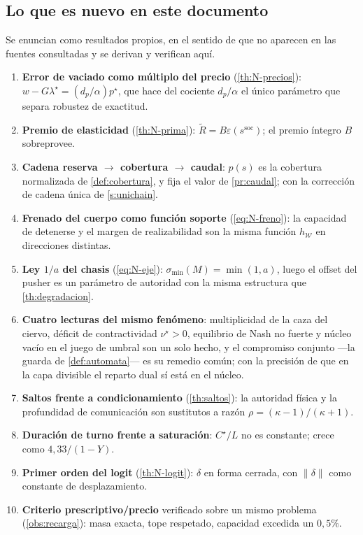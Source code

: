 \subsection{Lo que es nuevo en este documento}

Se enuncian como resultados propios, en el sentido de que no aparecen en las
fuentes consultadas y se derivan y verifican aquí.

\begin{enumerate}[leftmargin=2.0em,topsep=0.2em,itemsep=0.25em]
  \item \textbf{Error de vaciado como múltiplo del precio}
  (\cref{th:N-precios}): $w-G\lambda^\star=(d_p/\alpha)p^\star$, que hace del
  cociente $d_p/\alpha$ el único parámetro que separa robustez de exactitud.
  \item \textbf{Premio de elasticidad} (\cref{th:N-prima}):
  $\widetilde R=B\varepsilon(s^{\mathrm{soc}})$; el premio íntegro $B$ sobreprovee.
  \item \textbf{Cadena reserva $\to$ cobertura $\to$ caudal}: $p(s)$ es la
  cobertura normalizada de \cref{def:cobertura}, y fija el valor de
  \cref{pr:caudal}; con la corrección de cadena única de \cref{s:unichain}.
  \item \textbf{Frenado del cuerpo como función soporte}
  (\eqref{eq:N-freno}): la capacidad de detenerse y el margen de
  realizabilidad son la misma función $h_{\mathcal W}$ en direcciones
  distintas.
  \item \textbf{Ley $1/a$ del chasis} (\eqref{eq:N-eje}):
  $\sigma_{\min}(M)=\min(1,a)$, luego el offset del pusher es un parámetro de
  autoridad con la misma estructura que \cref{th:degradacion}.
  \item \textbf{Cuatro lecturas del mismo fenómeno}: multiplicidad de la caza
  del ciervo, déficit de contractividad $\nu^\star>0$, equilibrio de Nash no
  fuerte y núcleo vacío en el juego de umbral son un solo hecho, y el
  compromiso conjunto —la guarda de \cref{def:automata}— es su remedio común;
  con la precisión de que en la capa divisible el reparto dual sí está en el
  núcleo.
  \item \textbf{Saltos frente a condicionamiento} (\cref{th:saltos}): la
  autoridad física y la profundidad de comunicación son sustitutos a razón
  $\rho=(\kappa-1)/(\kappa+1)$.
  \item \textbf{Duración de turno frente a saturación}: $C^\star/L$ no es
  constante; crece como $4{,}33/(1-Y)$.
  \item \textbf{Primer orden del logit} (\cref{th:N-logit}): $\delta$ en forma
  cerrada, con $\lVert\delta\rVert$ como constante de desplazamiento.
  \item \textbf{Criterio prescriptivo/precio} verificado sobre un mismo
  problema (\cref{obs:recarga}): masa exacta, tope respetado, capacidad
  excedida un $0{,}5\%$.
\end{enumerate}
